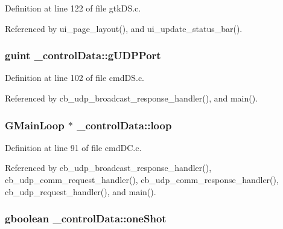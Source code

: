 Definition at line 122 of file gtk\+D\+S.\+c.



Referenced by ui\+\_\+page\+\_\+layout(), and ui\+\_\+update\+\_\+status\+\_\+bar().

\subsubsection[{\texorpdfstring{g\+U\+D\+P\+Port}{gUDPPort}}]{\setlength{\rightskip}{0pt plus 5cm}guint \+\_\+control\+Data\+::g\+U\+D\+P\+Port}\hypertarget{struct__control_data_a78b36762a9d85d027fc5e41576ade4f7}{}\label{struct__control_data_a78b36762a9d85d027fc5e41576ade4f7}


Definition at line 102 of file cmd\+D\+S.\+c.



Referenced by cb\+\_\+udp\+\_\+broadcast\+\_\+response\+\_\+handler(), and main().

\subsubsection[{\texorpdfstring{loop}{loop}}]{\setlength{\rightskip}{0pt plus 5cm}G\+Main\+Loop $\ast$ \+\_\+control\+Data\+::loop}\hypertarget{struct__control_data_ae1b70bafbd5eb568c6ca339664959216}{}\label{struct__control_data_ae1b70bafbd5eb568c6ca339664959216}


Definition at line 91 of file cmd\+D\+C.\+c.



Referenced by cb\+\_\+udp\+\_\+broadcast\+\_\+response\+\_\+handler(), cb\+\_\+udp\+\_\+comm\+\_\+request\+\_\+handler(), cb\+\_\+udp\+\_\+comm\+\_\+response\+\_\+handler(), cb\+\_\+udp\+\_\+request\+\_\+handler(), and main().

\subsubsection[{\texorpdfstring{one\+Shot}{oneShot}}]{\setlength{\rightskip}{0pt plus 5cm}gboolean \+\_\+control\+Data\+::one\+Shot}\hypertarget{struct__control_data_a772b5b4e4d92eee73100445963cbe682}{}\label{struct__control_data_a772b5b4e4d92eee73100445963cbe682}


